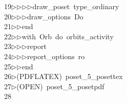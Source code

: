 \begin{tabbing}
19\>$\triangleright$\>$\triangleright$\>$\triangleright$\>$\triangleright$\>draw\_poset\ type\_ordinary\ \\[0pt]
20\>$\triangleright$\>$\triangleright$\>$\triangleright$\>draw\_options\ Do\ \\[0pt]
21\>$\triangleright$\>$\triangleright$\>end\ \\[0pt]
22\>$\triangleright$\>$\triangleright$\>with\ Orb\ do\ orbits\_activity\ \\[0pt]
23\>$\triangleright$\>$\triangleright$\>$\triangleright$\>report\ \ \\[0pt]
24\>$\triangleright$\>$\triangleright$\>$\triangleright$\>report\_options\ ro\ \\[0pt]
25\>$\triangleright$\>$\triangleright$\>end\ \\[0pt]
26\>$\triangleright$\>(PDFLATEX)\ poset\_5\_posettex\\[0pt]
27\>$\triangleright$\>(OPEN)\ poset\_5\_posetpdf\\[0pt]
28\>\end{tabbing}
